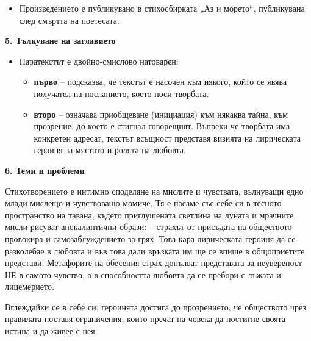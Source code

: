 \documentclass[12pt,a4paper]{article}
\begin{document}
\begin{itemize}[leftmargin=*]
\vspace{-0.2cm}
\item Произведението е публикувано в стихосбирката „Аз и морето“, публикувана след смъртта на поетесата.
\end{itemize}

\vspace{-0.2cm}
\noindent
\textbf{5. Тълкуване на заглавието}
\begin{itemize}[leftmargin=*, noitemsep, topsep=2pt, parsep=0pt]
    \item Паратекстът е двойно-смислово натоварен:
    \begin{itemize}[leftmargin=*]
        \item \textbf{първо} – подсказва, че текстът е насочен към някого, който се явява получател на посланието, което носи творбата.
        \item \textbf{второ} – означава приобщеване (инициация) към някаква тайна, към прозрение, до което е стигнал говорещият. Въпреки че творбата има конкретен адресат, текстът всъщност представя визията на лирическата героиня за мястото и ролята на любовта.
    \end{itemize}
\end{itemize}

\vspace{0.1cm}
 
\noindent 
\textbf{6. Теми и проблеми}
\vspace{0.1cm}
 
\indent Стихотворението е интимно споделяне на мислите и чувствата, вълнуващи едно млади мислещо и чувствоващо момиче. Тя е насаме със себе си в тесното пространство на тавана, където приглушената светлина на луната и мрачните мисли рисуват апокалиптични образи:
– страхът от присъдата на обществото провокира и самозаблуждението за грях. Това кара лирическата героиня да се разколебае в любовта и във това дали връзката им ще се впише в общоприетите представи. Метафорите на обесения страх допълват представата за неувереност НЕ в самото чувство, а в способността любовта да се пребори с лъжата и лицемерието.

\vspace{0.1cm}
 
\indent Вглеждайки се в себе си, героинята достига до прозрението, че обществото чрез правилата поставя ограничения, които пречат на човека да постигне своята истина и да живее с нея.

\vspace{0.1cm}
 
\end{document}
